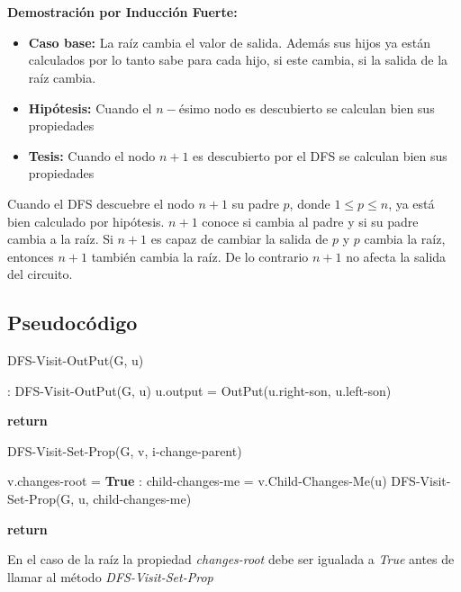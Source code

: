 \documentclass[a4paper,10pt]{article}
\begin{document}
	\\\\\textbf{Demostraci\'on por Inducci\'on Fuerte:} 
	\begin{itemize}
		\item \textbf{Caso base:} La ra\'iz cambia el valor de salida. Adem\'as sus hijos ya est\'an calculados por lo tanto sabe para cada hijo, si este cambia, si la salida  de la ra\'iz cambia.
		\item \textbf{Hip\'otesis:} Cuando el $n-$\'esimo nodo es descubierto se calculan bien sus propiedades
		\item \textbf{Tesis:} Cuando el nodo $n + 1$ es descubierto por el DFS se calculan bien sus propiedades
	\end{itemize}
	Cuando el DFS descuebre el nodo $n + 1$ su padre $p$, donde $1 \leq p \leq n$, ya est\'a bien calculado por hip\'otesis. $n+1$ conoce si cambia al padre y si su padre cambia a la ra\'iz. Si $n+1$ es capaz de cambiar la salida de $p$ y $p$ cambia la ra\'iz, entonces $n+1$ tambi\'en cambia la ra\'iz. De lo contrario $n + 1$ no afecta la salida del circuito.
	
	\subsection{Pseudoc\'odigo}
	\begin{algorithm}[H] 
		\caption{DFS-Visit-OutPut(G, u)}
		\begin{algorithmic}[1]
			:
			\State DFS-Visit-OutPut(G, u)
			\State u.output = OutPut(u.right-son, u.left-son) 
			\EndIf
			\EndFor
			
			\State \bf{return}
			
		\end{algorithmic}
	\end{algorithm}
	
	\begin{algorithm}[H] 
		\caption{DFS-Visit-Set-Prop(G, v, i-change-parent)}
		\begin{algorithmic}[1]
				\State \textnormal{v.changes-root = \bf{True}}
			\EndIf	
			:
			\State \textnormal{child-changes-me = v.Child-Changes-Me(u)}
			\State \textnormal{DFS-Visit-Set-Prop(G, u, child-changes-me)}
			\EndIf
			\EndFor
			
			\State \bf{return} 
			
		\end{algorithmic}
	\end{algorithm}
	En el caso de la ra\'iz la propiedad \emph{changes-root} debe ser igualada a \emph{True} antes de llamar al m\'etodo \emph{DFS-Visit-Set-Prop}
\end{document}
